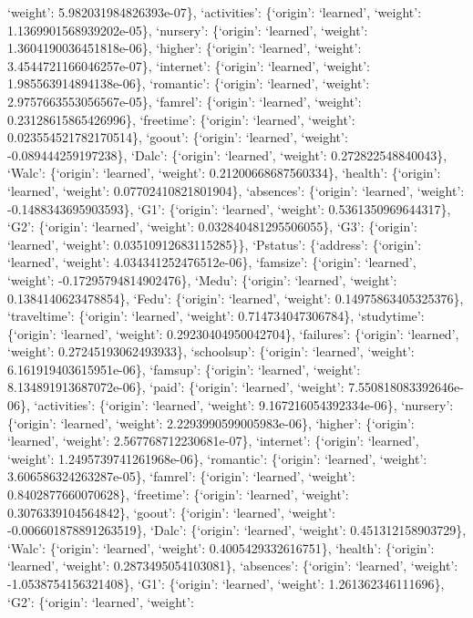 \documentclass[
]{article}
\begin{document}
`weight': 5.982031984826393e-07\}, `activities': \{`origin': `learned',
`weight': 1.1369901568939202e-05\}, `nursery': \{`origin': `learned',
`weight': 1.3604190036451818e-06\}, `higher': \{`origin': `learned',
`weight': 3.4544721166046257e-07\}, `internet': \{`origin': `learned',
`weight': 1.985563914894138e-06\}, `romantic': \{`origin': `learned',
`weight': 2.9757663553056567e-05\}, `famrel': \{`origin': `learned',
`weight': 0.23128615865426996\}, `freetime': \{`origin': `learned',
`weight': 0.023554521782170514\}, `goout': \{`origin': `learned',
`weight': -0.089444259197238\}, `Dalc': \{`origin': `learned', `weight':
0.272822548840043\}, `Walc': \{`origin': `learned', `weight':
0.21200668687560334\}, `health': \{`origin': `learned', `weight':
0.07702410821801904\}, `absences': \{`origin': `learned', `weight':
-0.1488343695903593\}, `G1': \{`origin': `learned', `weight':
0.5361350969644317\}, `G2': \{`origin': `learned', `weight':
0.032840481295506055\}, `G3': \{`origin': `learned', `weight':
0.03510912683115285\}\}, `Pstatus': \{`address': \{`origin': `learned',
`weight': 4.034341252476512e-06\}, `famsize': \{`origin': `learned',
`weight': -0.17295794814902476\}, `Medu': \{`origin': `learned',
`weight': 0.1384140623478854\}, `Fedu': \{`origin': `learned', `weight':
0.14975863405325376\}, `traveltime': \{`origin': `learned', `weight':
0.714734047306784\}, `studytime': \{`origin': `learned', `weight':
0.29230404950042704\}, `failures': \{`origin': `learned', `weight':
0.27245193062493933\}, `schoolsup': \{`origin': `learned', `weight':
6.161919403615951e-06\}, `famsup': \{`origin': `learned', `weight':
8.134891913687072e-06\}, `paid': \{`origin': `learned', `weight':
7.550818083392646e-06\}, `activities': \{`origin': `learned', `weight':
9.167216054392334e-06\}, `nursery': \{`origin': `learned', `weight':
2.2293990599005983e-06\}, `higher': \{`origin': `learned', `weight':
2.567768712230681e-07\}, `internet': \{`origin': `learned', `weight':
1.2495739741261968e-06\}, `romantic': \{`origin': `learned', `weight':
3.606586324263287e-05\}, `famrel': \{`origin': `learned', `weight':
0.8402877660070628\}, `freetime': \{`origin': `learned', `weight':
0.3076339104564842\}, `goout': \{`origin': `learned', `weight':
-0.006601878891263519\}, `Dalc': \{`origin': `learned', `weight':
0.451312158903729\}, `Walc': \{`origin': `learned', `weight':
0.4005429332616751\}, `health': \{`origin': `learned', `weight':
0.2873495054103081\}, `absences': \{`origin': `learned', `weight':
-1.0538754156321408\}, `G1': \{`origin': `learned', `weight':
1.261362346111696\}, `G2': \{`origin': `learned', `weight':
\end{document}
